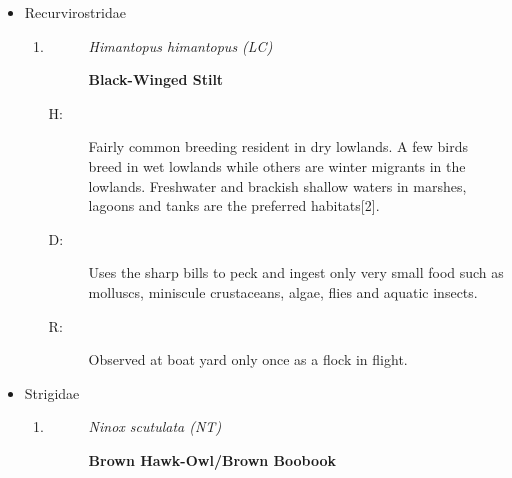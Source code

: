 \begin{itemize}
\begin{enumerate}
\begin{description}
\item[]%
\textit{Amaurornis phoenicurus (LC)}%
\item[]%
\textbf{White{-}Breasted Waterhen}%
\end{description}%
\begin{description}%
\item[H: ]%
Common breeding resident throughout the Island. Marshes, paddy fields and any other wet areas with thick cover are the preferred habitat{[}2{]}.%
\item[D: ]%
Aquatic plants, seeds, fruits, insects, and small fish. They forage by wading in shallow water and picking food from the surface.%
\item[R: ]%
boat yard and the surrounding shallow areas of Bolgoda lake.%
\end{description}%
\end{enumerate}%
\item%
Recurvirostridae%
\begin{enumerate}%
\item%
\begin{description}%
\item[]%
\textit{Himantopus himantopus (LC)}%
\item[]%
\textbf{Black{-}Winged Stilt}%
\end{description}%
\begin{description}%
\item[H: ]%
Fairly common breeding resident in dry lowlands. A few birds breed in wet lowlands while others are winter migrants in the lowlands. Freshwater and brackish shallow waters in marshes, lagoons and tanks are the preferred habitats{[}2{]}.%
\item[D: ]%
Uses the sharp bills to peck and ingest only very small food such as molluscs, miniscule crustaceans, algae, flies and aquatic insects.%
\item[R: ]%
Observed at boat yard only once as a flock in flight.%
\end{description}%
\end{enumerate}%
\item%
Strigidae%
\begin{enumerate}%
\item%
\begin{description}%
\item[]%
\textit{Ninox scutulata (NT)}%
\item[]%
\textbf{Brown Hawk{-}Owl/Brown Boobook}%
\end{description}%
\begin{description}%

\end{description}
\end{enumerate}
\end{itemize}
